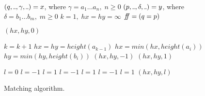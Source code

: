 \documentclass[AMA,STIX1COL]{WileyNJD-v2}
\newcommand{\Xund}{\rule{.4em}{.4pt}}
\begin{document}
\begin{figure*}
\begin{multicols}{2}
    \columnbreak

    \begin{algorithm}[H] \DontPrintSemicolon {} 
     {
        $(q, \Xund, \gamma, \Xund) = x$, where $\gamma = a_1 \dots a_n, \; n \geq 0$ \;
        $(p, \Xund, \delta, \Xund) = y$, where $\delta = b_1 \dots b_m, \; m \geq 0$ \;
        $k = 1, \; hx = hy = \infty$ \;
        $f\!\!f = (q = p)$ 

        \BlankLine
        \lIf { $\ff \wedge \gamma = \delta$ } {
            \Return $(hx, hy, 0)$
        }

        \BlankLine
        \If { $\ff$ } {
             {
              $k = k + 1$ %
            }
             {
                $hx = hy = height (a_{k-1})$
            }
        } 
         {
            $hx = min (hx, height (a_i))$
        }
         {
            $hy = min (hy, height (b_i))$
        }
         {\Return $(hx, hy, -1)$}
         {\Return $(hx, hy, 1)$}

        \BlankLine
        \If { $\ff$ } {
             { $l = 0$ }
             { $l = -1$ }
             { $l = 1$ }
             { $l = -1$ }
             { $l = 1$ }
             { $l = -1$ }
             { $l = 1$ }
        } 
        \Return $(hx, hy, l)$
    }
    \end{algorithm}
\end{multicols}
\vspace{-2em}
\begin{center}
\caption{Matching algorithm.}
\end{center}
\end{figure*}
\end{document}
